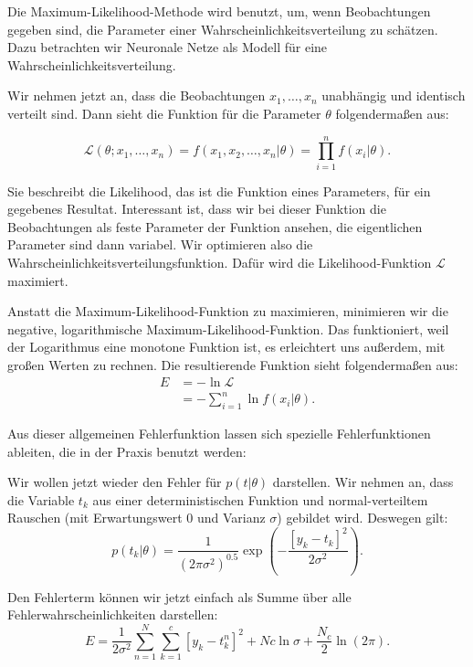 Die Maximum-Likelihood-Methode wird benutzt, um, wenn Beobachtungen gegeben sind, die Parameter einer Wahrscheinlichkeitsverteilung zu schätzen. Dazu betrachten wir Neuronale Netze als Modell für eine Wahrscheinlichkeitsverteilung.

Wir nehmen jetzt an, dass die Beobachtungen $x_1, \ldots , x_n$ unabhängig und identisch verteilt sind. Dann sieht die Funktion für die Parameter $\theta$ folgendermaßen aus:

\begin{equation}
  \mathcal{L} (\theta; x_1, \ldots, x_n) =
  f(x_1, x_2, \ldots, x_n | \theta) =
  \prod_{i = 1}^n f(x_i|\theta) .
\end{equation}

Sie beschreibt die Likelihood, das ist die Funktion eines Parameters, für ein gegebenes Resultat. Interessant ist, dass wir bei dieser Funktion die Beobachtungen als feste Parameter der Funktion ansehen, die eigentlichen Parameter sind dann variabel. Wir optimieren also die Wahrscheinlichkeitsverteilungsfunktion. Dafür wird die Likelihood-Funktion $\mathcal{L}$ maximiert.

Anstatt die Maximum-Likelihood-Funktion zu maximieren, minimieren wir die negative, logarithmische Maximum-Likelihood-Funktion. Das funktioniert, weil der Logarithmus eine monotone Funktion ist, es erleichtert uns außerdem, mit großen Werten zu rechnen. Die resultierende Funktion sieht folgendermaßen aus:
\begin{align}
 E  & = - \ln \mathcal{L} \\
  & = - \sum_{i=1}^n \ln f(x_i|\theta).
\end{align}

Aus dieser allgemeinen Fehlerfunktion lassen sich spezielle Fehlerfunktionen ableiten, die in der Praxis benutzt werden\cite{bishop1995neural}:

Wir wollen jetzt wieder den Fehler für $p(t|\theta)$ darstellen. Wir nehmen an, dass die Variable $t_k$ aus einer deterministischen Funktion und normal-verteiltem Rauschen (mit Erwartungswert $0$ und Varianz $\sigma$) gebildet wird.  
Deswegen gilt: %
\begin{equation}
  p(t_k|\theta) = \frac{1}{(2 \pi \sigma^2)^{0.5}} \exp \left( -\frac{ \left[  y_k - t_k \right]^2 }{2 \sigma^2} \right).
\end{equation}

Den Fehlerterm können wir jetzt einfach als Summe über alle Fehlerwahrscheinlichkeiten darstellen:
\begin{equation}
  E = \frac{1}{2 \sigma^2} \sum_{n=1}^{N} \sum_{k=1}^{c} \left[ y_k - t_k^n \right]^2 + Nc \ln \sigma + \frac{N_c}{2} \ln (2 \pi).
\end{equation}

